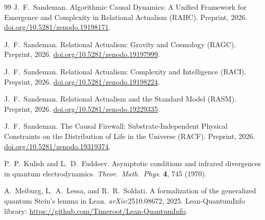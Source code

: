 \documentclass[11pt,a4paper]{article}
\theoremstyle{plain}
\theoremstyle{definition}
\theoremstyle{remark}
\begin{document}
\begin{thebibliography}{99}
J.~F.~Sandeman.
\newblock Algorithmic Causal Dynamics: A Unified Framework for Emergence and
  Complexity in Relational Actualism ({RAHC}).
\newblock Preprint, 2026.
\newblock \href{https://doi.org/10.5281/zenodo.19198171}{doi.org/10.5281/zenodo.19198171}.

J.~F.~Sandeman.
\newblock Relational Actualism: Gravity and Cosmology ({RAGC}).
\newblock Preprint, 2026.
\newblock \href{https://doi.org/10.5281/zenodo.19197999}{doi.org/10.5281/zenodo.19197999}.

J.~F.~Sandeman.
\newblock Relational Actualism: Complexity and Intelligence ({RACI}).
\newblock Preprint, 2026.
\newblock \href{https://doi.org/10.5281/zenodo.19198224}{doi.org/10.5281/zenodo.19198224}.

J.~F.~Sandeman.
\newblock Relational Actualism and the Standard Model ({RASM}).
\newblock Preprint, 2026.
\newblock \href{https://doi.org/10.5281/zenodo.19229335}{doi.org/10.5281/zenodo.19229335}.

J.~F.~Sandeman.
\newblock The Causal Firewall: Substrate-Independent Physical Constraints
  on the Distribution of Life in the Universe ({RACF}).
\newblock Preprint, 2026.
\newblock \href{https://doi.org/10.5281/zenodo.19319374}{doi.org/10.5281/zenodo.19319374}.


P.~P.~Kulish and L.~D.~Faddeev.
\newblock Asymptotic conditions and infrared divergences in quantum electrodynamics.
\newblock \textit{Theor.~Math.~Phys.} \textbf{4}, 745 (1970).

A.~Meiburg, L.~A.~Lessa, and R.~R.~Soldati.
\newblock A formalization of the generalized quantum {Stein's} lemma in {Lean}.
\newblock \textit{arXiv}:2510.08672, 2025.
\newblock Lean-QuantumInfo library: \url{https://github.com/Timeroot/Lean-QuantumInfo}.

\end{thebibliography}
\end{document}
